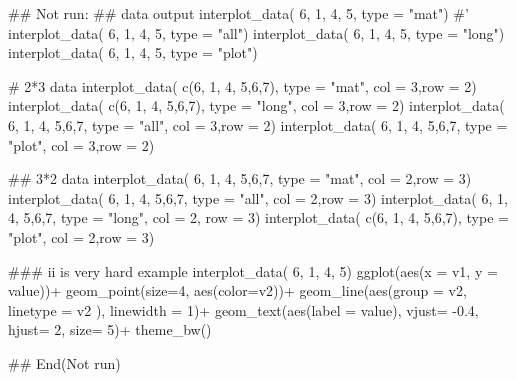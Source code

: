 \documentclass[a4paper]{book}
\begin{document}
\begin{Examples}
\begin{ExampleCode}
\#\# Not run: 
 ## data output
interplot_data( 6, 1, 4, 5, type = "mat")
#' interplot_data( 6, 1, 4, 5, type = "all")
interplot_data( 6, 1, 4, 5, type = "long")
interplot_data( 6, 1, 4, 5, type = "plot")

# 2*3 data
interplot_data( c(6, 1, 4, 5,6,7), type = "mat",  col = 3,row = 2)
interplot_data( c(6, 1, 4, 5,6,7), type = "long",  col = 3,row = 2)
interplot_data( 6, 1, 4, 5,6,7, type = "all",  col = 3,row = 2)
interplot_data( 6, 1, 4, 5,6,7, type = "plot",  col = 3,row = 2)

## 3*2 data
interplot_data( 6, 1, 4, 5,6,7, type = "mat",  col = 2,row = 3)
interplot_data( 6, 1, 4, 5,6,7, type = "all",  col = 2,row = 3)
interplot_data( 6, 1, 4, 5,6,7, type = "long",  col = 2, row = 3)
interplot_data( c(6, 1, 4, 5,6,7), type = "plot",  col = 2,row = 3)

### ii is very hard example
interplot_data( 6, 1, 4, 5) %
ggplot(aes(x = v1, y = value))+
geom_point(size=4, aes(color=v2))+
geom_line(aes(group = v2, linetype = v2 ), linewidth = 1)+
geom_text(aes(label = value), vjust= -0.4, hjust= 2, size= 5)+
theme_bw()


## End(Not run)
\end{ExampleCode}
\end{Examples}
\end{document}
